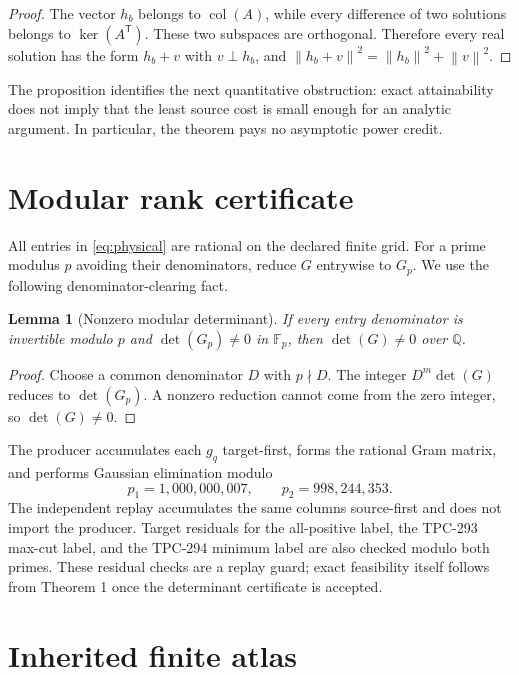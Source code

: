 \documentclass[10pt]{article}
\newtheorem{lemma}{Lemma}
\newcommand{\Q}{\mathbb{Q}}
\newcommand{\norm}[1]{\left\lVert #1\right\rVert}
\begin{document}
\begin{proof}
The vector $h_b$ belongs to $\operatorname{col}(A)$, while every difference
of two solutions belongs to $\ker(A^{\mathsf T})$.  These two subspaces are
orthogonal.  Therefore every real solution has the form $h_b+v$ with
$v\perp h_b$, and $\norm{h_b+v}^2=\norm{h_b}^2+\norm{v}^2$.
\end{proof}

The proposition identifies the next quantitative obstruction: exact
attainability does not imply that the least source cost is small enough for
an analytic argument.  In particular, the theorem pays no asymptotic power
credit.

\section{Modular rank certificate}

All entries in \eqref{eq:physical} are rational on the declared finite grid.
For a prime modulus $p$ avoiding their denominators, reduce $G$ entrywise
to $G_p$.  We use the following denominator-clearing fact.

\begin{lemma}[Nonzero modular determinant]
If every entry denominator is invertible modulo $p$ and
$\det(G_p)\ne0$ in $\mathbb F_p$, then $\det(G)\ne0$ over $\Q$.
\end{lemma}

\begin{proof}
Choose a common denominator $D$ with $p\nmid D$.  The integer
$D^m\det(G)$ reduces to $\det(G_p)$.  A nonzero reduction cannot come from
the zero integer, so $\det(G)\ne0$.
\end{proof}

The producer accumulates each $g_q$ target-first, forms the rational Gram
matrix, and performs Gaussian elimination modulo
\[
 p_1=1{,}000{,}000{,}007,\qquad p_2=998{,}244{,}353.
\]
The independent replay accumulates the same columns source-first and does
not import the producer.  Target residuals for the all-positive label, the
TPC-293 max-cut label, and the TPC-294 minimum label are also checked modulo
both primes.  These residual checks are a replay guard; exact feasibility
itself follows from Theorem 1 once the determinant certificate is accepted.

\section{Inherited finite atlas}
\end{document}
